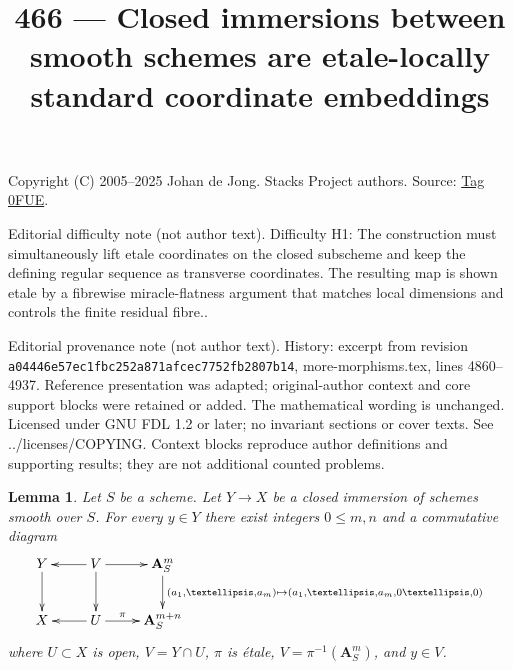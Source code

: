 \documentclass{amsart}
\theoremstyle{plain}
\newtheorem{lemma}[subsection]{Lemma}
\theoremstyle{definition}
\theoremstyle{remark}
\numberwithin{equation}{subsection}
\begin{document}
\title[Stacks Project, Tag 0FUE]{466 --- Closed immersions between smooth schemes are etale-locally standard coordinate embeddings}
\maketitle
\noindent Copyright (C) 2005--2025 Johan de Jong. Stacks Project authors. Source: \href{https://stacks.math.columbia.edu/tag/0FUE}{Tag 0FUE}.

\noindent Editorial difficulty note (not author text). Difficulty H1: The construction must simultaneously lift etale coordinates on the closed subscheme and keep the defining regular sequence as transverse coordinates. The resulting map is shown etale by a fibrewise miracle-flatness argument that matches local dimensions and controls the finite residual fibre..

\noindent Editorial provenance note (not author text). History: excerpt from revision \texttt{a0444\allowbreak 6e57e\allowbreak c1fbc\allowbreak 252a8\allowbreak 71afc\allowbreak ec775\allowbreak 2fb28\allowbreak 07b14}, more-morphisms.tex, lines 4860--4937. Reference presentation was adapted; original-author context and core support blocks were retained or added. The mathematical wording is unchanged. Licensed under GNU FDL 1.2 or later; no invariant sections or cover texts. See ../licenses/COPYING. Context blocks reproduce author definitions and supporting results; they are not additional counted problems.

\begin{lemma}
\label{lemma-etale-local-structure}
Let $S$ be a scheme. Let $Y \to X$ be a closed immersion of schemes
smooth over $S$. For every $y \in Y$ there exist integers
$0 \leq m, n$ and a commutative diagram
$$
\xymatrix{
Y \ar[d] &
V \ar[l] \ar[d] \ar[r] &
\mathbf{A}^m_S
\ar[d]^{(a_1, \ldots, a_m) \mapsto (a_1, \ldots, a_m, 0 \ldots, 0)} \\
X &
U \ar[l] \ar[r]^-\pi &
\mathbf{A}^{m + n}_S
}
$$
where $U \subset X$ is open, $V = Y \cap U$,
$\pi$ is \'etale, $V = \pi^{-1}(\mathbf{A}^m_S)$, and $y \in V$.
\end{lemma}
\end{document}
